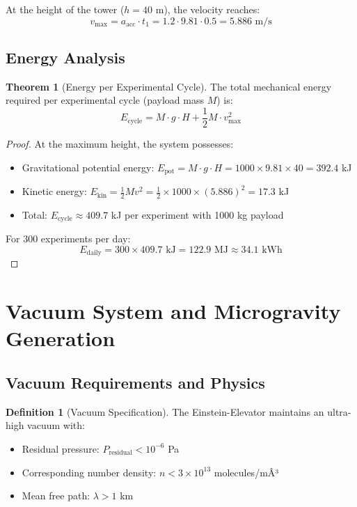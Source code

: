 ﻿\documentclass[a4paper,12pt]{article}
\theoremstyle{definition}
\newtheorem{definition}{Definition}
\newtheorem{theorem}{Theorem}
\begin{document}
At the height of the tower ($h = 40$ m), the velocity reaches:
\[
v_{\text{max}} = a_{\text{acc}} \cdot t_1 = 1.2 \cdot 9.81 \cdot 0.5 = 5.886 \text{ m/s}
\]

\subsection{Energy Analysis}

\begin{theorem}[Energy per Experimental Cycle]
The total mechanical energy required per experimental cycle (payload mass $M$) is:
\[
E_{\text{cycle}} = M \cdot g \cdot H + \frac{1}{2} M \cdot v_{\text{max}}^2
\]
\end{theorem}

\begin{proof}
At the maximum height, the system possesses:
\begin{itemize}
	\item Gravitational potential energy: $E_{\text{pot}} = M \cdot g \cdot H = 1000 \times 9.81 \times 40 = 392.4$ kJ
	\item Kinetic energy: $E_{\text{kin}} = \frac{1}{2} M v^2 = \frac{1}{2} \times 1000 \times (5.886)^2 = 17.3$ kJ
	\item Total: $E_{\text{cycle}} \approx 409.7$ kJ per experiment with 1000 kg payload
\end{itemize}

For 300 experiments per day:
\[
E_{\text{daily}} = 300 \times 409.7 \text{ kJ} = 122.9 \text{ MJ} \approx 34.1 \text{ kWh}
\]
\qedhere
\end{proof}

\section{Vacuum System and Microgravity Generation}
\label{sec:vacuum}

\subsection{Vacuum Requirements and Physics}

\begin{definition}[Vacuum Specification]
The Einstein-Elevator maintains an ultra-high vacuum with:
\begin{itemize}
	\item Residual pressure: $P_{\text{residual}} < 10^{-6}$ Pa
	\item Corresponding number density: $n < 3 \times 10^{13}$ molecules/mÂ³
	\item Mean free path: $\lambda > 1$ km
\end{itemize}
\end{definition}
\end{document}
